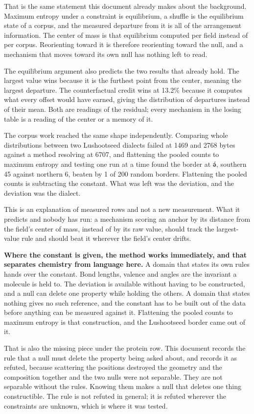 That is the same statement this document already makes about the background. Maximum entropy under a constraint is equilibrium, a shuffle is the equilibrium state of a corpus, and the measured departure from it is all of the arrangement information. The center of mass is that equilibrium computed per field instead of per corpus. Reorienting toward it is therefore reorienting toward the null, and a mechanism that moves toward its own null has nothing left to read.

The equilibrium argument also predicts the two results that already hold. The largest value wins because it is the furthest point from the center, meaning the largest departure. The counterfactual credit wins at 13.2\% because it computes what every offset would have earned, giving the distribution of departures instead of their mean. Both are readings of the residual; every mechanism in the losing table is a reading of the center or a memory of it.

The corpus work reached the same shape independently. Comparing whole distributions between two Lushootseed dialects failed at 1469 and 2768 bytes against a method resolving at 6707, and flattening the pooled counts to maximum entropy and testing one run at a time found the border at \texttt{ə́}, southern 45 against northern 6, beaten by 1 of 200 random borders. Flattening the pooled counts is subtracting the constant. What was left was the deviation, and the deviation was the dialect.

This is an explanation of measured rows and not a new measurement. What it predicts and nobody has run: a mechanism scoring an anchor by its distance from the field's center of mass, instead of by its raw value, should track the largest-value rule and should beat it wherever the field's center drifts.

\textbf{Where the constant is given, the method works immediately, and that separates chemistry from language here.} A domain that states its own rules hands over the constant. Bond lengths, valence and angles are the invariant a molecule is held to. The deviation is available without having to be constructed, and a null can delete one property while holding the others. A domain that states nothing gives no such reference, and the constant has to be built out of the data before anything can be measured against it. Flattening the pooled counts to maximum entropy is that construction, and the Lushootseed border came out of it.

That is also the missing piece under the protein row. This document records the rule that a null must delete the property being asked about, and records it as refuted, because scattering the positions destroyed the geometry and the composition together and the two nulls were not separable. They are not separable without the rules. Knowing them makes a null that deletes one thing constructible. The rule is not refuted in general; it is refuted wherever the constraints are unknown, which is where it was tested.

